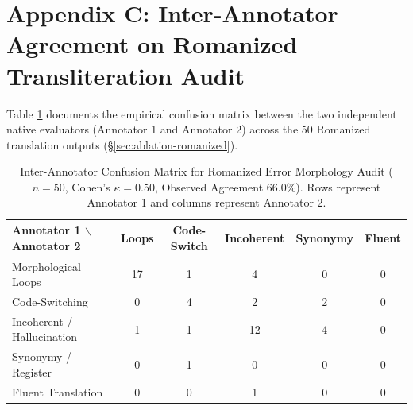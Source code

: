 \documentclass[acmsmall,review,anonymous]{acmart}
\begin{document}
\section*{Appendix C: Inter-Annotator Agreement on Romanized Transliteration Audit}
Table \ref{tab:confusion_matrix} documents the empirical confusion matrix between the two independent native evaluators (Annotator 1 and Annotator 2) across the 50 Romanized translation outputs (\S\ref{sec:ablation-romanized}).

\begin{table}[h]
\centering
\small
\setlength{\tabcolsep}{5pt}
\caption{Inter-Annotator Confusion Matrix for Romanized Error Morphology Audit ($n=50$, Cohen's $\kappa=0.50$, Observed Agreement 66.0\%). Rows represent Annotator 1 and columns represent Annotator 2.}
\label{tab:confusion_matrix}
\begin{tabular}{lccccc}
\toprule
\textbf{Annotator 1 $\backslash$ Annotator 2} & \textbf{Loops} & \textbf{Code-Switch} & \textbf{Incoherent} & \textbf{Synonymy} & \textbf{Fluent} \\
\midrule
Morphological Loops & 17 & 1 & 4 & 0 & 0 \\
Code-Switching & 0 & 4 & 2 & 2 & 0 \\
Incoherent / Hallucination & 1 & 1 & 12 & 4 & 0 \\
Synonymy / Register & 0 & 1 & 0 & 0 & 0 \\
Fluent Translation & 0 & 0 & 1 & 0 & 0 \\
\bottomrule
\end{tabular}
\end{table}
\end{document}
